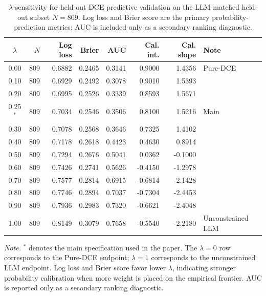 \documentclass[11pt]{article}
\begin{document}
\begin{table}[htbp]
\centering
\caption{\(\lambda\)-sensitivity for held-out DCE predictive validation on the LLM-matched held-out subset \(N=809\). Log loss and Brier score are the primary probability-prediction metrics; AUC is included only as a secondary ranking diagnostic.}
\label{tab:lambda_heldout}
\begin{tabular}{c r r r r r r l}
\toprule
\(\lambda\) & \(N\) & Log loss & Brier & AUC & Cal. int. & Cal. slope & Note \\
\midrule
0.00 & 809 & 0.6882 & 0.2465 & 0.3141 & 0.9000 & 1.4356 & Pure-DCE \\
0.10 & 809 & 0.6929 & 0.2492 & 0.3078 & 0.9010 & 1.5393 &  \\
0.20 & 809 & 0.6995 & 0.2526 & 0.3339 & 0.8593 & 1.5671 &  \\
0.25\(^*\) & 809 & 0.7034 & 0.2546 & 0.3506 & 0.8100 & 1.5216 & Main \\
0.30 & 809 & 0.7078 & 0.2568 & 0.3646 & 0.7325 & 1.4102 &  \\
0.40 & 809 & 0.7178 & 0.2618 & 0.4423 & 0.4630 & 0.8914 &  \\
0.50 & 809 & 0.7294 & 0.2676 & 0.5041 & 0.0362 & -0.1000 &  \\
0.60 & 809 & 0.7426 & 0.2741 & 0.5626 & -0.4150 & -1.2978 &  \\
0.70 & 809 & 0.7577 & 0.2814 & 0.6915 & -0.6814 & -2.1428 &  \\
0.80 & 809 & 0.7746 & 0.2894 & 0.7037 & -0.7304 & -2.4453 &  \\
0.90 & 809 & 0.7936 & 0.2983 & 0.7320 & -0.6621 & -2.4048 &  \\
1.00 & 809 & 0.8149 & 0.3079 & 0.7658 & -0.5540 & -2.2180 & Unconstrained LLM \\
\bottomrule
\end{tabular}

\vspace{0.3em}
\begin{minipage}{0.92\textwidth}
\small
\textit{Note.} \(^*\) denotes the main specification used in the paper. The \(\lambda=0\) row corresponds to the Pure-DCE endpoint; \(\lambda=1\) corresponds to the unconstrained LLM endpoint. Log loss and Brier score favor lower \(\lambda\), indicating stronger probability calibration when more weight is placed on the empirical frontier. AUC is reported only as a secondary ranking diagnostic.
\end{minipage}
\end{table}
\end{document}
